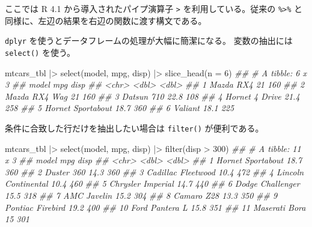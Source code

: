 \documentclass[
  letterpaper,
  xelatex,
  ja=standard, xelatex]{bxjsbook}
\newenvironment{Shaded}{\begin{snugshade}}{\end{snugshade}}
\newcommand{\AttributeTok}[1]{\textcolor[rgb]{0.40,0.45,0.13}{#1}}
\newcommand{\DecValTok}[1]{\textcolor[rgb]{0.68,0.00,0.00}{#1}}
\newcommand{\DocumentationTok}[1]{\textcolor[rgb]{0.37,0.37,0.37}{\textit{#1}}}
\newcommand{\FunctionTok}[1]{\textcolor[rgb]{0.28,0.35,0.67}{#1}}
\newcommand{\NormalTok}[1]{\textcolor[rgb]{0.00,0.23,0.31}{#1}}
\newcommand{\SpecialCharTok}[1]{\textcolor[rgb]{0.37,0.37,0.37}{#1}}
\begin{document}
ここでは R 4.1 から導入されたパイプ演算子
\texttt{\textbar{}\textgreater{}} を利用している。従来の
\texttt{\%\textgreater{}\%}
と同様に、左辺の結果を右辺の関数に渡す構文である。

\texttt{dplyr} を使うとデータフレームの処理が大幅に簡潔になる。
変数の抽出には \texttt{select()} を使う。

\begin{Shaded}
\begin{Highlighting}[]
\NormalTok{mtcars\_tbl }\SpecialCharTok{|\textgreater{}} 
  \FunctionTok{select}\NormalTok{(model, mpg, disp) }\SpecialCharTok{|\textgreater{}} 
  \FunctionTok{slice\_head}\NormalTok{(}\AttributeTok{n =} \DecValTok{6}\NormalTok{)}
\DocumentationTok{\#\# \# A tibble: 6 x 3}
\DocumentationTok{\#\#   model               mpg  disp}
\DocumentationTok{\#\#   \textless{}chr\textgreater{}             \textless{}dbl\textgreater{} \textless{}dbl\textgreater{}}
\DocumentationTok{\#\# 1 Mazda RX4          21     160}
\DocumentationTok{\#\# 2 Mazda RX4 Wag      21     160}
\DocumentationTok{\#\# 3 Datsun 710         22.8   108}
\DocumentationTok{\#\# 4 Hornet 4 Drive     21.4   258}
\DocumentationTok{\#\# 5 Hornet Sportabout  18.7   360}
\DocumentationTok{\#\# 6 Valiant            18.1   225}
\end{Highlighting}
\end{Shaded}

条件に合致した行だけを抽出したい場合は \texttt{filter()} が便利である。

\begin{Shaded}
\begin{Highlighting}[]
\NormalTok{mtcars\_tbl }\SpecialCharTok{|\textgreater{}} 
  \FunctionTok{select}\NormalTok{(model, mpg, disp) }\SpecialCharTok{|\textgreater{}} 
  \FunctionTok{filter}\NormalTok{(disp }\SpecialCharTok{\textgreater{}} \DecValTok{300}\NormalTok{)}
\DocumentationTok{\#\# \# A tibble: 11 x 3}
\DocumentationTok{\#\#    model                 mpg  disp}
\DocumentationTok{\#\#    \textless{}chr\textgreater{}               \textless{}dbl\textgreater{} \textless{}dbl\textgreater{}}
\DocumentationTok{\#\#  1 Hornet Sportabout    18.7   360}
\DocumentationTok{\#\#  2 Duster 360           14.3   360}
\DocumentationTok{\#\#  3 Cadillac Fleetwood   10.4   472}
\DocumentationTok{\#\#  4 Lincoln Continental  10.4   460}
\DocumentationTok{\#\#  5 Chrysler Imperial    14.7   440}
\DocumentationTok{\#\#  6 Dodge Challenger     15.5   318}
\DocumentationTok{\#\#  7 AMC Javelin          15.2   304}
\DocumentationTok{\#\#  8 Camaro Z28           13.3   350}
\DocumentationTok{\#\#  9 Pontiac Firebird     19.2   400}
\DocumentationTok{\#\# 10 Ford Pantera L       15.8   351}
\DocumentationTok{\#\# 11 Maserati Bora        15     301}
\end{Highlighting}
\end{Shaded}
\end{document}
